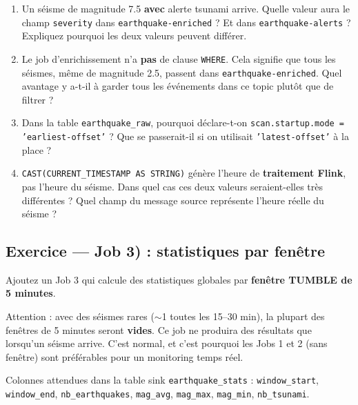 \documentclass[12pt,a4paper]{article}
\begin{document}
\begin{enumerate}[label=\textbf{Q\arabic*.}]
  \item Un séisme de magnitude 7.5 \textbf{avec} alerte tsunami arrive.
        Quelle valeur aura le champ \texttt{severity} dans \texttt{earthquake-enriched} ?
        Et dans \texttt{earthquake-alerts} ? Expliquez pourquoi les deux valeurs peuvent différer.
  \item Le job d'enrichissement n'a \textbf{pas} de clause \texttt{WHERE}.
        Cela signifie que tous les séismes, même de magnitude 2.5, passent dans
        \texttt{earthquake-enriched}. Quel avantage y a-t-il à garder tous les événements
        dans ce topic plutôt que de filtrer ?
  \item Dans la table \texttt{earthquake\_raw}, pourquoi déclare-t-on
        \texttt{scan.startup.mode = 'earliest-offset'} ?
        Que se passerait-il si on utilisait \texttt{'latest-offset'} à la place ?
  \item \texttt{CAST(CURRENT\_TIMESTAMP AS STRING)} génère l'heure de \textbf{traitement Flink},
        pas l'heure du séisme. Dans quel cas ces deux valeurs seraient-elles très différentes ?
        Quel champ du message source représente l'heure réelle du séisme ?
\end{enumerate}

\subsection*{Exercice --- Job 3) : statistiques par fenêtre}

Ajoutez un Job 3 qui calcule des statistiques globales par \textbf{fenêtre TUMBLE de 5 minutes}.

\begin{warningbox}
  Attention : avec des séismes rares ($\sim$1 toutes les 15--30 min), la plupart des
  fenêtres de 5 minutes seront \textbf{vides}. Ce job ne produira des résultats
  que lorsqu'un séisme arrive. C'est normal, et c'est pourquoi les Jobs 1 et 2
  (sans fenêtre) sont préférables pour un monitoring temps réel.
\end{warningbox}

Colonnes attendues dans la table sink \texttt{earthquake\_stats} :
\texttt{window\_start}, \texttt{window\_end}, \texttt{nb\_earthquakes},
\texttt{mag\_avg}, \texttt{mag\_max}, \texttt{mag\_min}, \texttt{nb\_tsunami}.

\newpage

\end{document}
